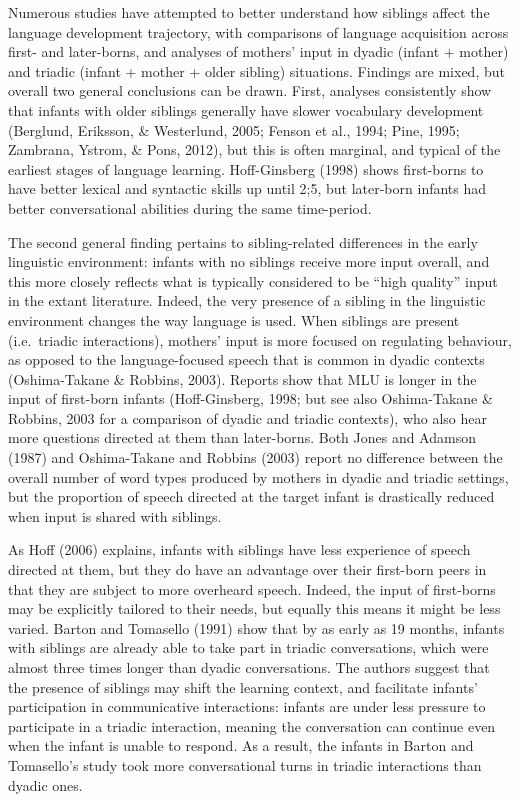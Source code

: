 \documentclass[
  english,
  man,floatsintext]{apa6}
\begin{document}
Numerous studies have attempted to better understand how siblings affect the language development trajectory, with comparisons of language acquisition across first- and later-borns, and analyses of mothers' input in dyadic (infant + mother) and triadic (infant + mother + older sibling) situations. Findings are mixed, but overall two general conclusions can be drawn. First, analyses consistently show that infants with older siblings generally have slower vocabulary development (Berglund, Eriksson, \& Westerlund, 2005; Fenson et al., 1994; Pine, 1995; Zambrana, Ystrom, \& Pons, 2012), but this is often marginal, and typical of the earliest stages of language learning. Hoff-Ginsberg (1998) shows first-borns to have better lexical and syntactic skills up until 2;5, but later-born infants had better conversational abilities during the same time-period.

The second general finding pertains to sibling-related differences in the early linguistic environment: infants with no siblings receive more input overall, and this more closely reflects what is typically considered to be \enquote{high quality} input in the extant literature. Indeed, the very presence of a sibling in the linguistic environment changes the way language is used. When siblings are present (i.e.~triadic interactions), mothers' input is more focused on regulating behaviour, as opposed to the language-focused speech that is common in dyadic contexts (Oshima-Takane \& Robbins, 2003). Reports show that MLU is longer in the input of first-born infants (Hoff-Ginsberg, 1998; but see also Oshima-Takane \& Robbins, 2003 for a comparison of dyadic and triadic contexts), who also hear more questions directed at them than later-borns. Both Jones and Adamson (1987) and Oshima-Takane and Robbins (2003) report no difference between the overall number of word types produced by mothers in dyadic and triadic settings, but the proportion of speech directed at the target infant is drastically reduced when input is shared with siblings.

As Hoff (2006) explains, infants with siblings have less experience of speech directed at them, but they do have an advantage over their first-born peers in that they are subject to more overheard speech. Indeed, the input of first-borns may be explicitly tailored to their needs, but equally this means it might be less varied. Barton and Tomasello (1991) show that by as early as 19 months, infants with siblings are already able to take part in triadic conversations, which were almost three times longer than dyadic conversations. The authors suggest that the presence of siblings may shift the learning context, and facilitate infants' participation in communicative interactions: infants are under less pressure to participate in a triadic interaction, meaning the conversation can continue even when the infant is unable to respond. As a result, the infants in Barton and Tomasello's study took more conversational turns in triadic interactions than dyadic ones.
\end{document}
